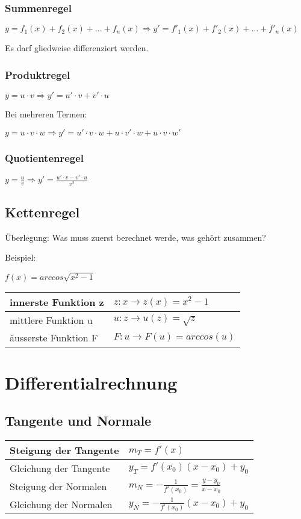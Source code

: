 \documentclass[a4paper,DIV10,12pt,headsepline,smallheadings,halfparskip-]{scrreprt}
\begin{document}
	\subsection{Summenregel}
	\(y = f_1(x)+f_2(x)+ ... +f_n(x) \Rightarrow y'=f'_1(x) + f'_2(x)+...+f'_n(x)\)

	Es darf gliedweise differenziert werden.
	\subsection{Produktregel}
	\(y=u \cdot v \Rightarrow y'=u' \cdot v + v' \cdot u\)

	Bei mehreren Termen:

	\(y=u \cdot v \cdot w \Rightarrow y'=u' \cdot v \cdot w + u \cdot v' \cdot w + u \cdot v \cdot w' \)
	\subsection{Quotientenregel}
	\(y = \frac{u}{v} \Rightarrow y' = \frac{u' \cdot v - v' \cdot u}{v^2}\)

	\section{Kettenregel}
	Überlegung: Was muss zuerst berechnet werde, was gehört zusammen?

	Beispiel:

	\hspace*{10mm} \(f(x) = arccos \sqrt{x^2-1} \)
	\newline
	\begin{tabular}{|l|l|}
		\hline
	   	innerste Funktion z & \(z: x \rightarrow z(x) = x^2-1\) \\
		\hline
		mittlere Funktion u & \(u: z \rightarrow u(z) = \sqrt{z}\) \\
		\hline
		äusserste Funktion F & \(F: u \rightarrow F(u) = arccos(u) \) \\
		\hline
	 \end{tabular}

	\chapter{Differentialrechnung}
	\section{Tangente und Normale}
	\begin{longtable}{p{}|p{}}
		Steigung der Tangente & \(m_T=f'(x)\)\\
		\hline
		Gleichung der Tangente & \(y_T = f'(x_0)(x-x_0) + y_0 \)\\
		\hline
		Steigung der Normalen & \(m_N=-\frac{1}{f'(x_0)} = \frac{y-y_0}{x-x_0} \)\\
		\hline
		Gleichung der Normalen & \(y_N = - \frac{1}{f'(x_0)}(x-x_0) + y_0 \) \\
	\end{longtable}
\end{document}
